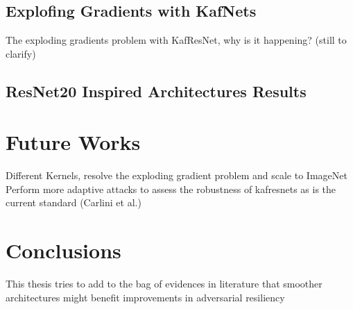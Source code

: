 \documentclass[LaM,binding=0.6cm]{./packages/sapthesis/sapthesis}
\begin{document}
    \section{Explofing Gradients with KafNets}

        The exploding gradients problem with KafResNet, why is it happening? (still to clarify)

    \section{ResNet20 Inspired Architectures Results}


\chapter{Future Works}

    Different Kernels, resolve the exploding gradient problem and scale to ImageNet
    Perform more adaptive attacks to assess the robustness of kafresnets as is the current standard (Carlini et al.)


\chapter{Conclusions}

    This thesis tries to add to the bag of evidences in literature that smoother architectures might benefit improvements in adversarial resiliency
    
    
\appendix


\backmatter
\end{document}
